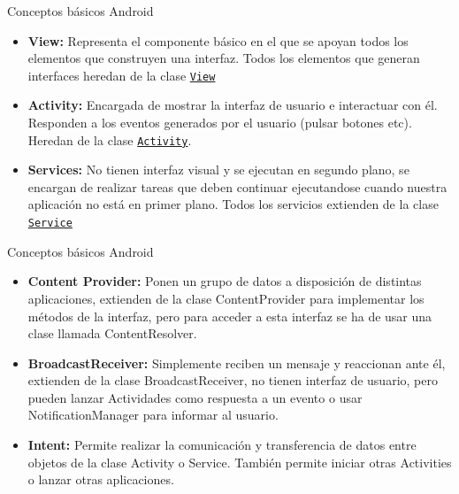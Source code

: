 \begin{frame}{Conceptos básicos Android}
  \begin{itemize}
    \item {\textbf{View:} Representa el componente básico en el que se apoyan todos los elementos que construyen una interfaz. Todos los elementos que generan interfaces heredan de la clase \texttt{\href{http://developer.android.com/reference/android/view/View.html}{View}}
    \pause
    }

  \item<2-> {
    \textbf{Activity:} Encargada de mostrar la interfaz de usuario e interactuar con él. Responden a los eventos generados por el usuario (pulsar botones etc). Heredan de la clase \href{http://developer.android.com/reference/android/app/Activity.html}{\texttt{Activity}}.
  }
  \item<3-> { \textbf{Services:} No tienen interfaz visual y se ejecutan en segundo plano, se encargan de realizar tareas que deben continuar ejecutandose cuando nuestra aplicación no está en primer plano. Todos los servicios extienden de la clase \texttt{\href{http://developer.android.com/reference/android/app/Service.html}{Service}}
  }
  \end{itemize}
\end{frame}

\begin{frame}{Conceptos básicos Android}
  \begin{itemize}
  \item{
    \textbf{Content Provider:} Ponen un grupo de datos a disposición de distintas aplicaciones, extienden de la clase ContentProvider para implementar los métodos de la interfaz, pero para acceder a esta interfaz se ha de usar una clase llamada ContentResolver.
    \pause
  }
  \item<2-> {
    \textbf{BroadcastReceiver:} Simplemente reciben un mensaje y reaccionan ante él, extienden de la clase BroadcastReceiver, no tienen interfaz de usuario, pero pueden lanzar Actividades como respuesta a un evento o usar NotificationManager para informar al usuario.
  }
  \item<3-> {
    \textbf{Intent:} Permite realizar la comunicación y transferencia de datos entre objetos de la clase Activity o Service. También permite iniciar otras Activities o lanzar otras aplicaciones.
  }
  \end{itemize}
\end{frame}

